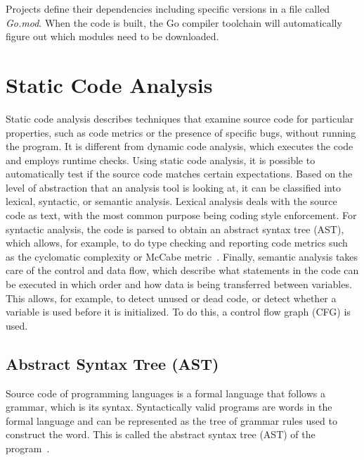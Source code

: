 

Projects define their dependencies including specific versions in a file called \textit{Go.mod}.
When the code is built, the Go compiler toolchain will automatically figure out which modules need to be downloaded.



\section{Static Code Analysis}\label{sec:background:static-code-analysis}

Static code analysis describes techniques that examine source code for particular properties, such as code metrics or
the presence of specific bugs, without running the program.
It is different from dynamic code analysis, which executes the code and employs runtime checks.
Using static code analysis, it is possible to automatically test if the source code matches certain expectations.
Based on the level of abstraction that an analysis tool is looking at, it can be classified into lexical, syntactic,
or semantic analysis.
Lexical analysis deals with the source code as text, with the most common purpose being coding style enforcement.
For syntactic analysis, the code is parsed to obtain an abstract syntax tree (\acrshort{AST}), which allows, for
example, to do type checking and reporting code metrics such as the cyclomatic complexity or McCabe
metric~\cite{watson1996}.
Finally, semantic analysis takes care of the control and data flow, which describe what statements in the code can
be executed in which order and how data is being transferred between variables.
This allows, for example, to detect unused or dead code, or detect whether a variable is used before it is initialized.
To do this, a control flow graph (\acrshort{CFG}) is used.



\subsection{Abstract Syntax Tree (AST)}\label{subsec:background:static-code-analysis:ast}

Source code of programming languages is a formal language that follows a grammar, which is its syntax.
Syntactically valid programs are words in the formal language and can be represented as the tree of grammar rules used
to construct the word.
This is called the abstract syntax tree (\acrshort{AST}) of the program~\cite{cooper2011}.

